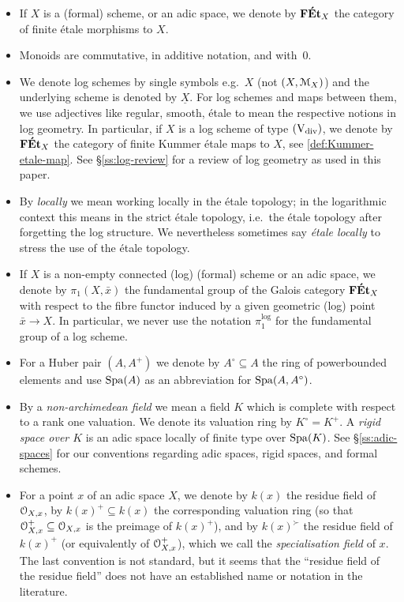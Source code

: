 \begin{itemize}[leftmargin=*]
    \item 
    If $X$ is a (formal) scheme, or an adic space, we denote by $\mathbf{F\acute{E}t}_X$ the category of finite \'etale morphisms to $X$. 
    \item 
    Monoids are commutative, in additive notation, and with~$0$.
    \item 
    We denote log schemes by single symbols e.g.~$X$ (not $(X, {\mathcal M}_X)$) and the underlying scheme is denoted by $\underline{X}$. For log schemes and maps between them, we use adjectives like regular, smooth, \'etale to mean the respective notions in log geometry. In particular, if $X$ is a log scheme of type $(\mathrm{V}_{\rm div})$, we denote by $\mathbf{F\acute{E}t}_X$ the category of finite Kummer \'etale maps to $X$, see \cref{def:Kummer-etale-map}. See \S\ref{ss:log-review} for a review of log geometry as used in this paper.

    \item 
    By \emph{locally} we mean working locally in the \'etale topology; in the logarithmic context this means in the strict \'etale topology, i.e.~the \'etale topology after forgetting the log structure. We nevertheless sometimes say \emph{\'etale locally} to stress the use of the \'etale topology.
    
    \item 
    If $X$ is a non-empty connected (log) (formal) scheme or an adic space, we denote by $\pi_1(X,\bar x)$ the fundamental group of the Galois category $\mathbf{F\acute{E}t}_X$ with respect to the fibre functor induced by a given geometric (log) point $\bar x\to X$. In particular, we never use the notation $\pi_1^{\log}$ for the fundamental group of a log scheme.
    
    \item 
    For a Huber pair $(A,A^+)$ we denote by $A^\circ\subseteq A$ the ring of powerbounded elements and use $\operatorname{Spa}(A)$ as an abbreviation for $\operatorname{Spa}(A,A^\circ)$. 
    
    \item 
    By a \emph{non-archimedean field} we mean a field $K$ which is complete with respect to a rank one valuation. We denote its valuation ring by $K^\circ=K^+$. A \emph{rigid space over $K$} is an adic space locally of finite type over $\operatorname{Spa}(K)$. See \S\ref{ss:adic-spaces} for our conventions regarding adic spaces, rigid spaces, and formal schemes. 
    
    \item 
    For a point $x$ of an adic space $X$, we denote by $k(x)$ the residue field of ${\mathcal O}_{X, x}$, by $k(x)^+\subseteq k(x)$ the corresponding valuation ring (so that ${\mathcal O}_{X,x}^+ \subseteq {\mathcal O}_{X,x}$ is the preimage of $k(x)^+$), and by $k(x)^\succ$ the residue field of $k(x)^+$ (or equivalently of ${\mathcal O}_{X,x}^+$), which we call the \emph{specialisation field} of $x$. The last convention is not standard, but it seems that the ``residue field of the residue field'' does not have an established name or notation in the literature. 
        

\end{itemize}
